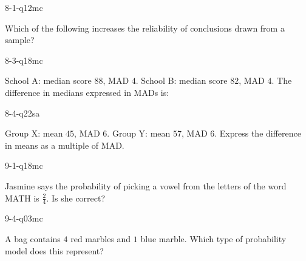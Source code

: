 \begin{practiceQuestion}{8-1-q12}{mc}
\begin{questionText}
Which of the following increases the reliability of conclusions drawn from a sample?
\end{questionText}
\end{practiceQuestion}

\begin{practiceQuestion}{8-3-q18}{mc}
\begin{questionText}
School A: median score $88$, MAD $4$. School B: median score $82$, MAD $4$. The difference in medians expressed in MADs is:
\end{questionText}
\end{practiceQuestion}

\begin{practiceQuestion}{8-4-q22}{sa}
\begin{questionText}
Group X: mean $45$, MAD $6$. Group Y: mean $57$, MAD $6$. Express the difference in means as a multiple of MAD.
\end{questionText}
\end{practiceQuestion}

\begin{practiceQuestion}{9-1-q18}{mc}
\begin{questionText}
Jasmine says the probability of picking a vowel from the letters of the word MATH is $\frac{2}{4}$. Is she correct?
\end{questionText}
\end{practiceQuestion}

\begin{practiceQuestion}{9-4-q03}{mc}
\begin{questionText}
A bag contains $4$ red marbles and $1$ blue marble. Which type of probability model does this represent?
\end{questionText}
\end{practiceQuestion}

